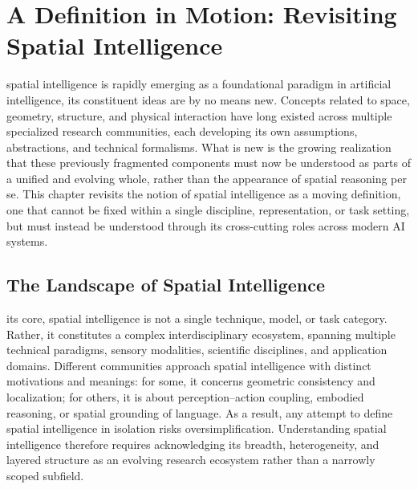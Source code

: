 


\chapter{A Definition in Motion: Revisiting Spatial Intelligence}
\label{chapter:definition}


spatial intelligence is rapidly emerging as a foundational paradigm in artificial intelligence, its constituent ideas are by no means new. 
Concepts related to space, geometry, structure, and physical interaction have long existed across multiple specialized research communities, each developing its own assumptions, abstractions, and technical formalisms. 
What is new is the growing realization that these previously fragmented components must now be understood as parts of a unified and evolving whole, rather than the appearance of spatial reasoning per se.
This chapter revisits the notion of spatial intelligence as a moving definition, one that cannot be fixed within a single discipline, representation, or task setting, but must instead be understood through its cross-cutting roles across modern AI systems.










\section{The Landscape of Spatial Intelligence}
\label{sec:p1-sec2-the-landscape-of-spatial-intelligence}

its core, spatial intelligence is not a single technique, model, or task category.
Rather, it constitutes a complex interdisciplinary ecosystem, spanning multiple technical paradigms, sensory modalities, scientific disciplines, and application domains.
Different communities approach spatial intelligence with distinct motivations and meanings: for some, it concerns geometric consistency and localization; for others, it is about perception–action coupling, embodied reasoning, or spatial grounding of language.
As a result, any attempt to define spatial intelligence in isolation risks oversimplification.
Understanding spatial intelligence therefore requires acknowledging its breadth, heterogeneity, and layered structure as an evolving research ecosystem rather than a narrowly scoped subfield.







